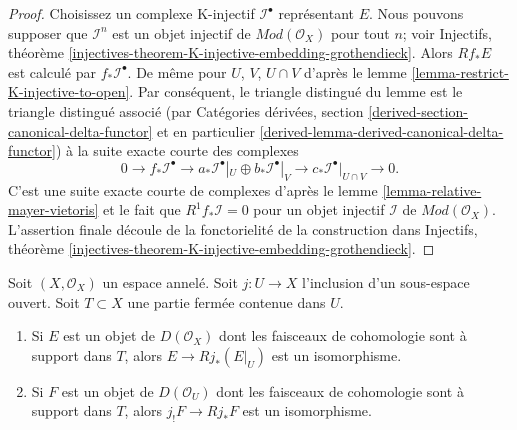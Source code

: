 \begin{proof}

Choisissez un complexe K-injectif $\mathcal{I}^\bullet$
représentant $E$. Nous pouvons supposer que $\mathcal{I}^n$ est un objet injectif de $\textit{Mod}(\mathcal{O}_X)$ pour tout $n$; voir Injectifs, théorème
\ref{injectives-theorem-K-injective-embedding-grothendieck}. Alors $Rf_*E$ est calculé par $f_*\mathcal{I}^\bullet$. De même pour $U$, $V$, $U \cap V$ d'après le lemme \ref{lemma-restrict-K-injective-to-open}. Par conséquent, le triangle distingué du lemme est le triangle distingué associé (par Catégories dérivées, section
\ref{derived-section-canonical-delta-functor} et en particulier \ref{derived-lemma-derived-canonical-delta-functor}) à la suite exacte courte des complexes
$$
0 \to
f_*\mathcal{I}^\bullet \to
a_*\mathcal{I}^\bullet|_U \oplus b_*\mathcal{I}^\bullet|_V \to
c_*\mathcal{I}^\bullet|_{U \cap V} \to
0.
$$
C'est une suite exacte courte de complexes d'après le lemme \ref{lemma-relative-mayer-vietoris}
et le fait que $R^1f_*\mathcal{I} = 0$
pour un objet injectif $\mathcal{I}$ de $\textit{Mod}(\mathcal{O}_X)$. L'assertion finale découle de la fonctorielité de la construction dans Injectifs, théorème
\ref{injectives-theorem-K-injective-embedding-grothendieck}.

\end{proof}

\begin{lemma}

\label{lemma-pushforward-restriction}
Soit $(X, \mathcal{O}_X)$ un espace annelé. Soit $j : U \to X$ l'inclusion d'un sous-espace ouvert. Soit $T \subset X$ une partie fermée contenue dans $U$.
\begin{enumerate}
\item Si $E$ est un objet de $D(\mathcal{O}_X)$ dont les faisceaux de cohomologie sont à support dans $T$, alors $E \to Rj_*(E|_U)$ est un isomorphisme.
\item Si $F$ est un objet de $D(\mathcal{O}_U)$ dont les faisceaux de cohomologie sont à support dans $T$, alors $j_!F \to Rj_*F$ est un isomorphisme.
\end{enumerate}

\end{lemma}

